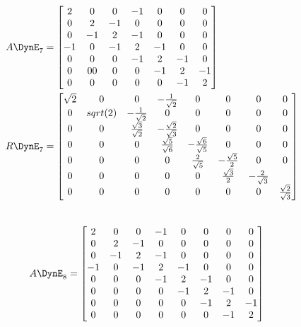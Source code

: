  \begin{align*}
 A\DynE_{7} &  =  \begin{bmatrix}
 2 & 0 & 0 & -1 & 0 & 0 & 0\\
 0 & 2 & -1 & 0 & 0 & 0 & 0\\
 0 & -1 & 2 & -1 & 0 & 0 & 0\\
 -1 & 0 & -1 & 2 & -1 & 0 & 0\\
 0 & 0 & 0 & -1 & 2 & -1 & 0\\
 0 & 0 0 & 0 & 0 & -1 & 2 & -1\\
 0 & 0 & 0 & 0 & 0 & -1 & 2\\
 \end{bmatrix}\\
 R\DynE_{7} &  =  \begin{bmatrix}
 \sqrt{2} & 0 & 0 & -\frac{1}{\sqrt{2}} & 0 & 0 & 0 & 0\\
 0 & sqrt(2) & - \frac{1}{\sqrt{2}}& 0 & 0 & 0 & 0 & 0\\
 0 & 0 & \frac{\sqrt{3}}{\sqrt{2}} & -\frac{\sqrt{2}}{\sqrt{3}} & 0 & 0 & 0 & 0\\
 0 & 0 & 0 & \frac{\sqrt{5}}{\sqrt{6}} & -\frac{\sqrt{6}}{\sqrt{5}} & 0 & 0 & 0\\
 0 & 0 & 0 & 0 & \frac{2}{\sqrt{5}} & -\frac{\sqrt{5}}{2} & 0 & 0\\
 0 & 0 & 0 & 0 & 0 & \frac{\sqrt{3}}{2} & -\frac{2}{\sqrt{3}}\\
 0 & 0 & 0 & 0 & 0 & 0 & 0 & \frac{\sqrt{2}}{\sqrt{3}}\\
 \end{bmatrix}
 \end{align*}\\

 \begin{align*}
 A\DynE_{8} &  = \begin{bmatrix}
 2 & 0 & 0 & -1 & 0 & 0 & 0 & 0\\
 0 & 2 & -1 & 0 & 0 & 0 & 0 & 0\\
 0 & -1 & 2 & -1 & 0 & 0 & 0 & 0\\
 -1 & 0 & -1 & 2 & -1 & 0 & 0 & 0\\
 0 & 0 & 0 & -1 & 2 & -1 & 0 & 0 \\
 0 & 0 & 0 & 0 & -1 & 2 & -1 & 0\\
 0 & 0 & 0 & 0 & 0 & -1 & 2 & -1\\
 0 & 0 & 0 & 0 & 0 & 0 & -1 & 2\\
 \end{bmatrix}
\end{align*}

